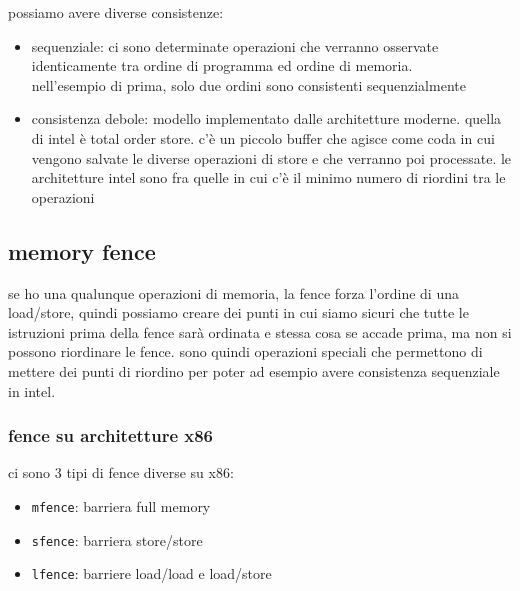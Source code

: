 \documentclass[12pt, oneside]{extbook} %
\begin{document}
possiamo avere diverse consistenze:
\begin{itemize}
\item sequenziale: ci sono determinate operazioni che verranno osservate identicamente tra ordine di programma ed ordine di memoria.\\ nell'esempio di prima, solo due ordini sono consistenti sequenzialmente
\item consistenza debole: modello implementato dalle architetture moderne. quella di intel è total order store. c'è un piccolo buffer che agisce come coda in cui vengono salvate le diverse operazioni di store e che verranno poi processate. le architetture intel sono fra quelle in cui c'è il minimo numero di riordini tra le operazioni
\end{itemize}
\subsection{memory fence}
se ho una qualunque operazioni di memoria, la fence forza l'ordine di una load/store, quindi possiamo creare dei punti in cui siamo sicuri che tutte le istruzioni prima della fence sarà ordinata e stessa cosa se accade prima, ma non si possono riordinare le fence. sono quindi operazioni speciali che permettono di mettere dei punti di riordino per poter ad esempio avere consistenza sequenziale in intel.
\subsubsection{fence su architetture x86}
ci sono 3 tipi di fence diverse su x86:
\begin{itemize}
\item \texttt{mfence}: barriera full memory
\item \texttt{sfence}: barriera store/store
\item \texttt{lfence}: barriere load/load e load/store
\end{itemize}
\end{document}
